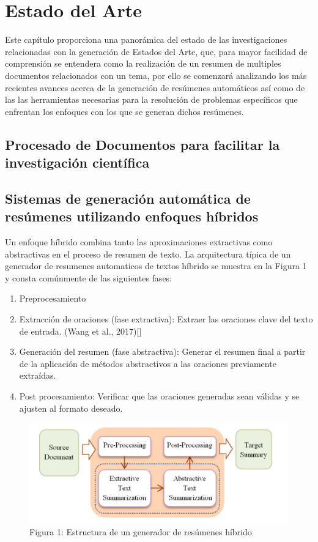 \chapter{Estado del Arte}\label{chapter:state-of-the-art}
    Este capítulo proporciona una panorámica del estado de las investigaciones relacionadas con la generación de Estados del Arte, que, para mayor facilidad de comprensión se entendera como la realización de un resumen de multiples documentos relacionados con un tema, por ello se comenzará analizando los más recientes avances acerca de la generación de resúmenes automáticos así como de las las herramientas necesarias para la resolución de problemas específicos que enfrentan los enfoques con los que se generan dichos resúmenes.
\section{Procesado de Documentos para facilitar la investigación científica}


\section{Sistemas de generación automática de resúmenes utilizando enfoques híbridos}

Un enfoque híbrido combina tanto las aproximaciones extractivas como abstractivas en el proceso de resumen de texto. La arquitectura típica  de un generador de resumenes automaticos de textos híbrido se muestra en la Figura 1 y consta comúnmente de las siguientes fases:

\begin{enumerate}
    \item Preprocesamiento
    \item Extracción de oraciones (fase extractiva): Extraer las oraciones clave del texto de entrada. (Wang et al., 2017)[\cite{Wang}]
    \item Generación del resumen (fase abstractiva): Generar el resumen final a partir de la aplicación de métodos abstractivos a las oraciones previamente extraídas.
    \item Post procesamiento: Verificar que las oraciones generadas sean válidas y se ajusten al formato deseado.
\end{enumerate}

\begin{figure}[H]    
    \centering
    \includegraphics[scale = 1]{Figures/hybrid.png}
    \caption*{Figura 1: Estructura de un generador de resúmenes híbrido}
\end{figure}

